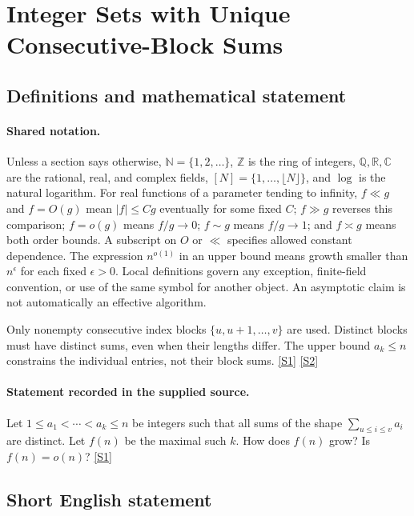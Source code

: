 \documentclass[11pt,a4paper]{article}
\newcommand{\N}{\mathbb{N}}
\newcommand{\Z}{\mathbb{Z}}
\newcommand{\Q}{\mathbb{Q}}
\newcommand{\R}{\mathbb{R}}
\newcommand{\C}{\mathbb{C}}
\newcommand{\sref}[2]{\hyperlink{source:#1:#2}{[S#2]}}
\begin{document}
\section{Integer Sets with Unique Consecutive-Block Sums}\label{statement}


\subsection{Definitions and mathematical statement}

\paragraph{Shared notation.}Unless a section says otherwise, $\N=\{1,2,\ldots\}$,
$\Z$ is the ring of integers, $\Q,\R,\C$ are the rational, real, and complex
fields, $[N]=\{1,\ldots,\lfloor N\rfloor\}$, and $\log$ is the natural
logarithm. For real functions of a parameter tending to infinity,
$f\ll g$ and $f=O(g)$ mean $|f|\leq Cg$ eventually for some fixed $C$;
$f\gg g$ reverses this comparison; $f=o(g)$ means $f/g\to0$;
$f\sim g$ means $f/g\to1$; and $f\asymp g$ means both order bounds.
A subscript on $O$ or $\ll$ specifies allowed constant dependence.
The expression $n^{o(1)}$ in an upper bound means growth smaller than
$n^\epsilon$ for each fixed $\epsilon>0$. Local definitions govern any
exception, finite-field convention, or use of the same symbol for another
object. An asymptotic claim is not automatically an effective algorithm.



Only nonempty consecutive index blocks $\{u,u+1,\ldots,v\}$ are used. Distinct blocks must have distinct sums, even when their lengths differ. The upper bound $a_k\leq n$ constrains the individual entries, not their block sums. \sref{statement}{1} \sref{statement}{2}

\paragraph{Statement recorded in the supplied source.}
Let $1\leq a_1<\cdots <a_k\leq n$ be integers such that all sums of the shape $\sum_{u\leq i\leq v}a_i$ are distinct. Let $f(n)$ be the maximal such $k$.
How does $f(n)$ grow? Is $f(n)=o(n)$? \sref{statement}{1}

\subsection{Short English statement}
\end{document}
